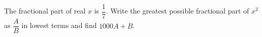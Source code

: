 The fractional part of real $x$ is $\dfrac{1}{7}$. Write the greatest possible fractional part of $x^2$ as $\dfrac{A}{B}$ in lowest terms and find $1000A+B$.

